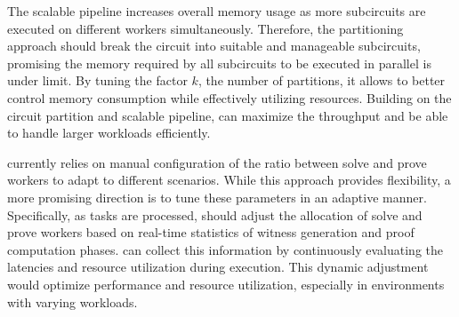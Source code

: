 The scalable pipeline increases overall memory usage as more subcircuits are executed on different workers simultaneously. Therefore, the partitioning approach should break the circuit into suitable and manageable subcircuits, promising the memory required by all subcircuits to be executed in parallel is under limit. By tuning the factor $k$, the number of partitions, it allows \system to better control memory consumption while effectively utilizing resources. Building on the circuit partition and scalable pipeline, \system can maximize the throughput and be able to handle larger \zk workloads efficiently.

\system currently relies on manual configuration of the ratio between solve and prove workers to adapt to different scenarios. While this approach provides flexibility, a more promising direction is to tune these parameters in an adaptive manner. Specifically, as tasks are processed, \system should adjust the allocation of solve and prove workers based on real-time statistics of witness generation and proof computation phases. \system can collect this information by continuously evaluating the latencies and resource utilization during execution. This dynamic adjustment would optimize performance and resource utilization, especially in environments with varying workloads. 


